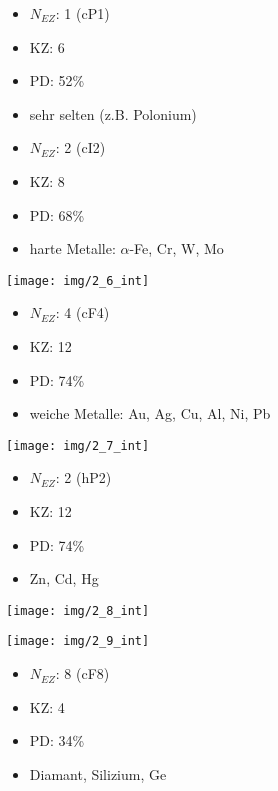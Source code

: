 

\begin{itemize}
	\item $N_{EZ}$: 1 (cP1)
	\item KZ: 6
	\item PD: 52\%
	\item sehr selten (z.B. Polonium)
\end{itemize}

\begin{minipage}{.4\textwidth}
	\begin{itemize}
		\item $N_{EZ}$: 2 (cI2)
		\item KZ: 8
		\item PD: 68\%
		\item harte Metalle: $\alpha$-Fe, Cr, W, Mo
	\end{itemize}	
\end{minipage}
\begin{minipage}{.6\textwidth}
	\texttt{[image: img/2\_6\_int]}
\end{minipage}

\begin{minipage}{.4\textwidth}
	\begin{itemize}
		\item $N_{EZ}$: 4 (cF4)
		\item KZ: 12
		\item PD: 74\%
		\item weiche Metalle: Au, Ag, Cu, Al, Ni, Pb
	\end{itemize}	
\end{minipage}
\begin{minipage}{.6\textwidth}
	\texttt{[image: img/2\_7\_int]}
\end{minipage}

\begin{minipage}{.4\textwidth}
	\begin{itemize}
		\item $N_{EZ}$: 2 (hP2)
		\item KZ: 12
		\item PD: 74\%
		\item Zn, Cd, Hg
	\end{itemize}	
\end{minipage}
\begin{minipage}{.6\textwidth}
	\texttt{[image: img/2\_8\_int]}
\end{minipage}

\newpage
{}

\texttt{[image: img/2\_9\_int]}

\begin{itemize}
	\item $N_{EZ}$: 8 (cF8)
	\item KZ: 4
	\item PD: 34\%
	\item Diamant, Silizium, Ge
\end{itemize}








